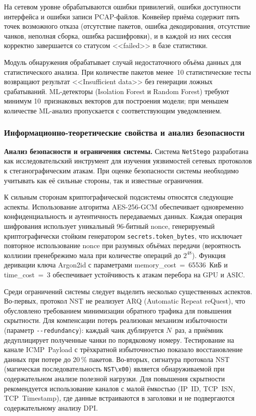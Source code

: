 На сетевом уровне обрабатываются ошибки привилегий, ошибки доступности интерфейса и ошибки записи PCAP-файлов. Конвейер приёма содержит пять точек возможного отказа (отсутствие пакетов, ошибка декодирования, отсутствие чанков, неполная сборка, ошибка расшифровки), и в каждой из них сессия корректно завершается со статусом <<failed>> в базе статистики.

Модуль обнаружения обрабатывает случай недостаточного объёма данных для статистического анализа. При количестве пакетов менее~10 статистические тесты возвращают результат <<Insufficient data>> без генерации ложных срабатываний. ML-детекторы (Isolation Forest и Random Forest) требуют минимум 10~признаковых векторов для построения модели; при меньшем количестве ML-анализ пропускается с соответствующим уведомлением.

\subsubsection{Информационно-теоретические свойства и анализ безопасности}

\textbf{Анализ безопасности и ограничения системы.} Система \texttt{NetStego} разработана как исследовательский инструмент для изучения уязвимостей сетевых протоколов к стеганографическим атакам. При оценке безопасности системы необходимо учитывать как её сильные стороны, так и известные ограничения.

К сильным сторонам криптографической подсистемы относятся следующие аспекты. Использование алгоритма AES-256-GCM обеспечивает одновременно конфиденциальность и аутентичность передаваемых данных. Каждая операция шифрования использует уникальный 96-битный nonce, генерируемый криптографически стойким генератором \texttt{secrets.token\_bytes}, что исключает повторное использование nonce при разумных объёмах передачи (вероятность коллизии пренебрежимо мала при количестве операций до $2^{48}$). Функция деривации ключа Argon2id с параметрами memory\_cost~=~65536~КиБ и time\_cost~=~3 обеспечивает устойчивость к атакам перебора на GPU и ASIC.

Среди ограничений системы следует выделить несколько существенных аспектов. Во-первых, протокол NST не реализует ARQ (Automatic Repeat reQuest), что обусловлено требованием минимизации обратного трафика для повышения скрытности. Для компенсации потерь реализован механизм избыточности (параметр \texttt{-{}-redundancy}): каждый чанк дублируется $N$~раз, а приёмник дедуплицирует полученные чанки по порядковому номеру. Тестирование на канале ICMP~Payload с трёхкратной избыточностью показало восстановление данных при потере до 20\,\% пакетов. Во-вторых, сигнатура протокола NST (магическая последовательность \texttt{NST\textbackslash x00}) является обнаруживаемой при содержательном анализе полезной нагрузки. Для повышения скрытности рекомендуется использование каналов с малой ёмкостью (IP~ID, TCP~ISN, TCP~Timestamp), где данные встраиваются в заголовки и не подвергаются содержательному анализу DPI.


